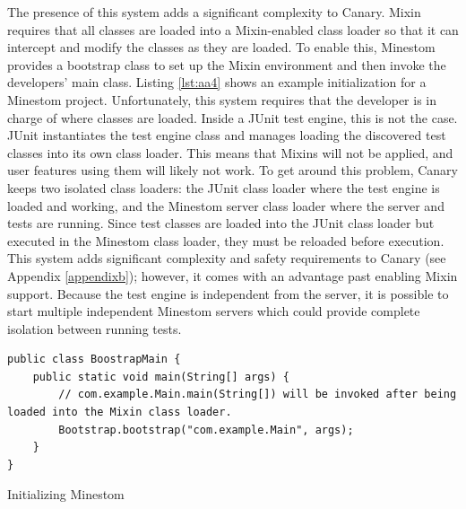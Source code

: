 \documentclass[12pt]{article}
\begin{document}
\begin{onehalfspacing}
The presence of this system adds a significant complexity to Canary.
Mixin requires that all classes are loaded into a Mixin-enabled class
loader so that it can intercept and modify the classes as they are
loaded. To enable this, Minestom provides a bootstrap class to set up
the Mixin environment and then invoke the developers' main class.
Listing \ref{lst:aa4} shows an example initialization for a Minestom project.
Unfortunately, this system requires that the developer is in charge of
where classes are loaded. Inside a JUnit test engine, this is not the
case. JUnit instantiates the test engine class and manages loading the
discovered test classes into its own class loader. This means that
Mixins will not be applied, and user features using them will likely not
work. To get around this problem, Canary keeps two isolated class
loaders: the JUnit class loader where the test engine is loaded and
working, and the Minestom server class loader where the server and tests
are running. Since test classes are loaded into the JUnit class loader
but executed in the Minestom class loader, they must be reloaded before
execution. This system adds significant complexity and safety
requirements to Canary (see Appendix \ref{appendixb}); however, it comes with an
advantage past enabling Mixin support. Because the test engine is
independent from the server, it is possible to start multiple
independent Minestom servers which could provide complete isolation
between running tests.

\begin{listing}[H]
\begin{verbatim}
public class BoostrapMain {
    public static void main(String[] args) {
        // com.example.Main.main(String[]) will be invoked after being loaded into the Mixin class loader.
        Bootstrap.bootstrap("com.example.Main", args);
    }
}
\end{verbatim}
\caption{Initializing Minestom}
\label{lst:aa4}
\end{listing}







\end{onehalfspacing}
\end{document}
